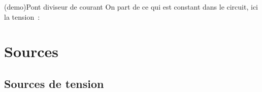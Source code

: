 \documentclass[../../main/main.tex]{subfiles}
\begin{document}
\begin{tcb*}[label=demo:divcour](demo){Pont diviseur de courant}
	On part de ce qui est constant dans le circuit, ici la tension~:
	\vspace{-15pt}
\end{tcb*}

\section{Sources}
\subsection{Sources de tension}
\end{document}
